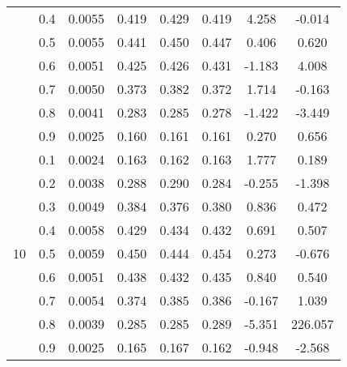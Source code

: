 \documentclass[11pt,a4paper]{report}
\begin{document}
\begin{longtable}{ | c | c || c | c | c | c | c | c | }
 & 0.4 & 0.0055 & 0.419 & 0.429 & 0.419 & 4.258 & -0.014 \\
 & 0.5 & 0.0055 & 0.441 & 0.450 & 0.447 & 0.406 & 0.620 \\
 & 0.6 & 0.0051 & 0.425 & 0.426 & 0.431 & -1.183 & 4.008 \\
 & 0.7 & 0.0050 & 0.373 & 0.382 & 0.372 & 1.714 & -0.163 \\
 & 0.8 & 0.0041 & 0.283 & 0.285 & 0.278 & -1.422 & -3.449 \\
 & 0.9 & 0.0025 & 0.160 & 0.161 & 0.161 & 0.270 & 0.656 \\
 \hline
\multirow{9}{*}{10} & 0.1 & 0.0024 & 0.163 & 0.162 & 0.163 & 1.777 & 0.189 \\
 & 0.2 & 0.0038 & 0.288 & 0.290 & 0.284 & -0.255 & -1.398 \\
 & 0.3 & 0.0049 & 0.384 & 0.376 & 0.380 & 0.836 & 0.472 \\
 & 0.4 & 0.0058 & 0.429 & 0.434 & 0.432 & 0.691 & 0.507 \\
 & 0.5 & 0.0059 & 0.450 & 0.444 & 0.454 & 0.273 & -0.676 \\
 & 0.6 & 0.0051 & 0.438 & 0.432 & 0.435 & 0.840 & 0.540 \\
 & 0.7 & 0.0054 & 0.374 & 0.385 & 0.386 & -0.167 & 1.039 \\
 & 0.8 & 0.0039 & 0.285 & 0.285 & 0.289 & -5.351 & 226.057 \\
 & 0.9 & 0.0025 & 0.165 & 0.167 & 0.162 & -0.948 & -2.568 \\
 \hline
\hline
\end{longtable}
\end{document}
